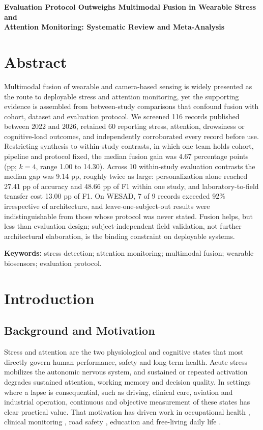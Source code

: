 \begin{center}
{\large\bfseries Evaluation Protocol Outweighs Multimodal Fusion in Wearable Stress and\\[2pt]
Attention Monitoring: Systematic Review and Meta-Analysis}\\[10pt]
\end{center}

\section*{Abstract}
Multimodal fusion of wearable and camera-based sensing is widely presented as the route to
deployable stress and attention monitoring, yet the supporting evidence is assembled from
between-study comparisons that confound fusion with cohort, dataset and evaluation protocol.
We screened 116 records published between 2022 and 2026, retained 60 reporting stress,
attention, drowsiness or cognitive-load outcomes, and independently corroborated every record
before use. Restricting synthesis to within-study contrasts, in which one team holds cohort,
pipeline and protocol fixed, the median fusion gain was 4.67 percentage points (pp; $k=4$,
range 1.00 to 14.30). Across 10 within-study evaluation contrasts the median gap was 9.14 pp,
roughly twice as large: personalization alone reached 27.41 pp of accuracy and 48.66 pp of F1
within one study, and laboratory-to-field transfer cost 13.00 pp of F1. On WESAD, 7 of 9
records exceeded 92\% irrespective of architecture, and leave-one-subject-out results were
indistinguishable from those whose protocol was never stated. Fusion helps, but less than
evaluation design; subject-independent field validation, not further architectural
elaboration, is the binding constraint on deployable systems.

\textbf{Keywords:} stress detection; attention monitoring; multimodal fusion; wearable
biosensors; evaluation protocol.

\section{Introduction}

\subsection{Background and Motivation}
Stress and attention are the two physiological and cognitive states that most directly
govern human performance, safety and long-term health. Acute stress mobilizes the autonomic
nervous system, and sustained or repeated activation degrades sustained attention, working
memory and decision quality. In settings where a lapse is consequential, such as driving,
clinical care, aviation and industrial operation, continuous and objective measurement of
these states has clear practical value. That motivation has driven work in occupational
health \cite{r4,r5,r61}, clinical monitoring \cite{r3,r28,r115}, road safety \cite{r7,r8,r45},
education \cite{r30,r74,r99} and free-living daily life \cite{r10,r13,r35}.


